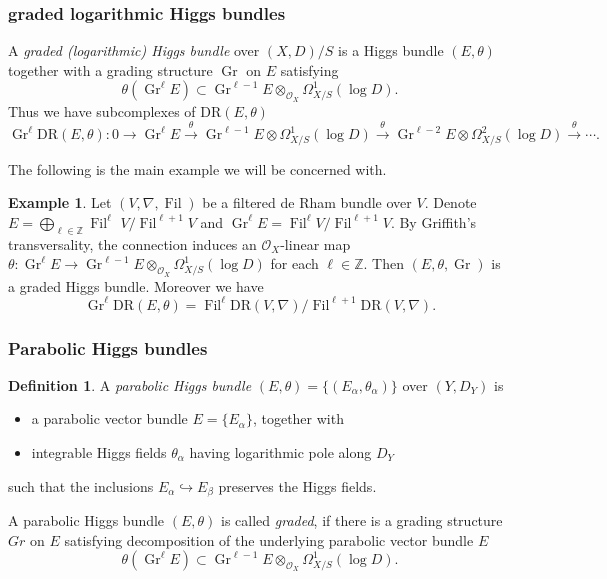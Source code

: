 \documentclass[12pt,twoside]{book}
\theoremstyle{plain}
\theoremstyle{definition}
\newtheorem{definition}[definition]{Definition}
\newtheorem{example}[example]{Example}
\theoremstyle{remark}
\newcommand{\bZ}{{\mathbb Z}}
\newcommand{\mO}{{\mathcal O}}
\DeclareMathOperator\Fil{Fil}
\DeclareMathOperator\Gr{Gr}
\numberwithin{equation}{section}
\def\DR{{\mathrm{DR}}}
\begin{document}
\subsubsection{graded logarithmic Higgs bundles} A \emph{graded (logarithmic) Higgs bundle} over $(X,D)/S$ is a Higgs bundle $(E,\theta)$ together with a grading structure $\Gr$ on $E$ satisfying
\[\theta(\Gr^\ell E) \subset \Gr^{\ell -1}E\otimes_{\mO_X} \Omega^1_{X/S}(\log D).\]
Thus we have subcomplexes of $\DR(E,\theta)$
\[\Gr^\ell \DR(E,\theta):
 0
\rightarrow \Gr^\ell E
\xrightarrow{\theta} \Gr^{\ell-1} E \otimes \Omega^1_{X/S}(\log D)
\xrightarrow{\theta} \Gr^{\ell-2} E \otimes \Omega^2_{X/S}(\log D)
\xrightarrow{\theta} \cdots.\]

The following is the main example we will be concerned with.
\begin{example}
Let $(V,\nabla,\Fil)$ be a filtered de Rham bundle over $V$. Denote $E =\bigoplus_{\ell\in \mathbb Z} \Fil^\ell$ $ V/\Fil^{\ell+1}V$ and $\Gr^\ell E = \Fil^\ell V/\Fil^{\ell+1}V$. By Griffith's transversality, the connection induces an $\mO_X$-linear map $\theta \colon \Gr^\ell E \rightarrow \Gr^{\ell-1} E \otimes_{\mO_X} \Omega^1_{X/S}(\log D)$ for each $\ell\in \bZ$. Then $(E,\theta,\Gr)$ is a graded Higgs bundle. Moreover we have
\[\Gr^{\ell} \DR(E,\theta) = \Fil^\ell \DR(V,\nabla) / \Fil^{\ell+1} \DR(V,\nabla).\]
\end{example}

\subsubsection{Parabolic Higgs bundles}

\begin{definition}
A \emph{parabolic Higgs bundle} $(E,\theta)=\{(E_\alpha,\theta_\alpha)\}$ over $(Y,D_Y)$ is
\begin{itemize}
\item a parabolic vector bundle $E=\{E_\alpha\}$, together with
\item integrable Higgs fields $\theta_\alpha$ having logarithmic pole along $D_Y$
\end{itemize}
such that the inclusions $E_\alpha\hookrightarrow E_\beta$ preserves the Higgs fields.

A parabolic Higgs bundle $(E,\theta)$ is called \emph{graded}, if there is a grading structure $Gr$ on $E$ satisfying decomposition of the underlying parabolic vector bundle $E$
\[\theta(\Gr^\ell E) \subset \Gr^{\ell -1}E\otimes_{\mO_X} \Omega^1_{X/S}(\log D).\]
\end{definition}
\end{document}
